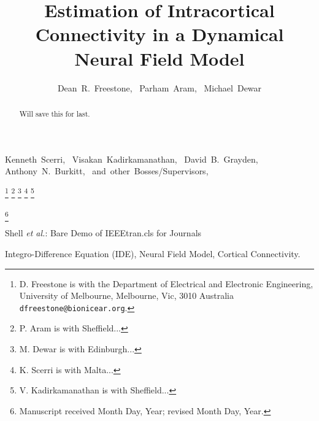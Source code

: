 \documentclass[onecolumn,draftcls]{IEEEtran}
\begin{document}
\title{Estimation of Intracortical Connectivity in a Dynamical Neural Field Model}

\author{Dean~R.~Freestone,~
        Parham~Aram,~
        Michael~Dewar}
        Kenneth~Scerri,~
        Visakan~Kadirkamanathan,~
        David~B.~Grayden,~
        Anthony~N.~Burkitt,~
        and~other~Bosses/Supervisors,~%

\thanks{D. Freestone is with the Department
of Electrical and Electronic Engineering, University of Melbourne, Melbourne,
Vic, 3010 Australia {\tt\small dfreestone@bionicear.org}.}%
\thanks{P. Aram is with Sheffield...}
\thanks{M. Dewar is with Edinburgh...}
\thanks{K. Scerri is with Malta...}
\thanks{V. Kadirkamanathan is with Sheffield...}

\thanks{Manuscript received Month Day, Year; revised Month Day, Year.}


%
{Shell \MakeLowercase{\textit{et al.}}: Bare Demo of IEEEtran.cls for Journals}

\maketitle

\begin{abstract}
Will save this for last.
\end{abstract}


\begin{IEEEkeywords}
Integro-Difference Equation (IDE), Neural Field Model, Cortical Connectivity.
\end{IEEEkeywords}

\IEEEpeerreviewmaketitle
\end{document}
